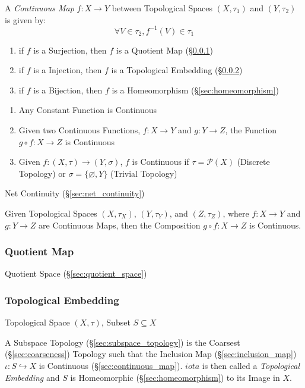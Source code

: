 A \emph{Continuous Map} $f : X \rightarrow Y$ between Topological
Spaces $(X,\tau_1)$ and $(Y,\tau_2)$ is given by:
\[
  \forall V \in \tau_2, f^{-1}(V) \in \tau_1
\]

\begin{enumerate}
  \item if $f$ is a Surjection, then $f$ is a Quotient Map
    (\S\ref{sec:quotient_map})
  \item if $f$ is a Injection, then $f$ is a Topological Embedding
    (\S\ref{sec:topological_embedding})
  \item if $f$ is a Bijection, then $f$ is a Homeomorphism
    (\S\ref{sec:homeomorphism})
\end{enumerate}

\begin{enumerate}
  \item Any Constant Function is Continuous
  \item Given two Continuous Functions, $f : X \rightarrow Y$ and $g
    : Y \rightarrow Z$, the Function $g \circ f : X \rightarrow Z$ is
    Continuous
  \item Given $f : (X, \tau) \rightarrow (Y, \sigma)$, $f$ is
    Continuous if $\tau = \mathcal{P}(X)$ (Discrete Topology) or
    $\sigma = \{\varnothing, Y\}$ (Trivial Topology)
\end{enumerate}

Net Continuity (\S\ref{sec:net_continuity})

Given Topological Spaces $(X, \tau_X)$, $(Y, \tau_Y)$, and $(Z,
\tau_Z)$, where $f: X \rightarrow Y$ and $g: Y \rightarrow Z$ are
Continuous Maps, then the Composition $g \circ f : X \rightarrow Z$ is
Continuous.



\subsubsection{Quotient Map}\label{sec:quotient_map}

Quotient Space (\S\ref{sec:quotient_space})



\subsubsection{Topological Embedding}\label{sec:topological_embedding}

Topological Space $(X,\tau)$, Subset $S \subseteq X$

A Subspace Topology (\S\ref{sec:subspace_topology}) is the Coarsest
(\S\ref{sec:coarseness}) Topology such that the Inclusion Map
(\S\ref{sec:inclusion_map}) $\iota : S \hookrightarrow X$ is
Continuous (\S\ref{sec:continuous_map}). $iota$ is then called a
\emph{Topological Embedding} and $S$ is Homeomorphic
(\S\ref{sec:homeomorphism}) to its Image in $X$.



